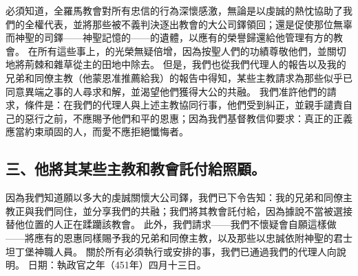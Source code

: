 必須知道，全羅馬教會對所有忠信的行為深懷感激，無論是以虔誠的熱忱協助了我們的全權代表，並將那些被不義判決逐出教會的大公司鐸領回；還是促使那位無辜而神聖的司鐸——神聖記憶的——的遺體，以應有的榮譽歸還給他管理有方的教會。\newline{} 在所有這些事上，的光榮無疑倍增，因為按聖人們的功績尊敬他們，並關切地將荊棘和雜草從主的田地中除去。\newline{} 但是，我們也從我們代理人的報告以及我的兄弟和同僚主教（他蒙恩准推薦給我）的報告中得知，某些主教請求為那些似乎已同意異端之事的人尋求和解，並渴望他們獲得大公的共融。\newline{} 我們准許他們的請求，條件是：在我們的代理人與上述主教協同行事，他們受到糾正，並親手譴責自己的惡行之前，不應賜予他們和平的恩惠；因為我們基督教信仰要求：真正的正義應當約束頑固的人，而愛不應拒絕懺悔者。\par


\subsection{三、他將其某些主教和教會託付給照顧。}

因為我們知道願以多大的虔誠關懷大公司鐸，我們已下令告知：我的兄弟和同僚主教正與我們同住，並分享我們的共融；我們將其教會託付給，因為據說不當被選接替他位置的人正在蹂躪該教會。\newline{} 此外，我們請求——我們不懷疑會自願這樣做——將應有的恩惠同樣賜予我的兄弟和同僚主教，以及那些以忠誠依附神聖的君士坦丁堡神職人員。\newline{} 關於所有必須執行或安排的事，我們已通過我們的代理人向說明。\newline{} 日期：執政官之年（451年）四月十三日。\par


